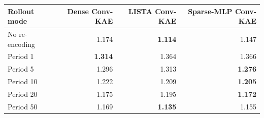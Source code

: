 \begin{tabular}{lrrr}
\toprule
Rollout mode & Dense Conv-KAE & LISTA Conv-KAE & Sparse-MLP Conv-KAE \\
\midrule
No re-encoding & 1.174 & \textbf{1.114} & 1.147 \\
Period 1 & \textbf{1.314} & 1.364 & 1.366 \\
Period 5 & 1.296 & 1.313 & \textbf{1.276} \\
Period 10 & 1.222 & 1.209 & \textbf{1.205} \\
Period 20 & 1.175 & 1.195 & \textbf{1.172} \\
Period 50 & 1.169 & \textbf{1.135} & 1.155 \\
\bottomrule
\end{tabular}
